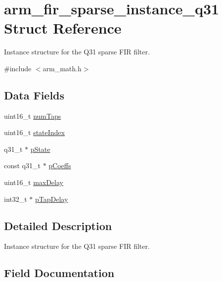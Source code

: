 \hypertarget{structarm__fir__sparse__instance__q31}{}\section{arm\+\_\+fir\+\_\+sparse\+\_\+instance\+\_\+q31 Struct Reference}
\label{structarm__fir__sparse__instance__q31}


Instance structure for the Q31 sparse F\+IR filter.  




{\ttfamily \#include $<$arm\+\_\+math.\+h$>$}

\subsection*{Data Fields}
\begin{DoxyCompactItemize}
\item 
uint16\+\_\+t \mbox{\hyperlink{structarm__fir__sparse__instance__q31_a751941891e47f522a7f5375fe8990aac}{num\+Taps}}
\item 
uint16\+\_\+t \mbox{\hyperlink{structarm__fir__sparse__instance__q31_a566a0cb53437e48b9a3bf18e5b03d8aa}{state\+Index}}
\item 
q31\+\_\+t $\ast$ \mbox{\hyperlink{structarm__fir__sparse__instance__q31_adee4ba3ee8869865af7d8fa08ca913d6}{p\+State}}
\item 
const q31\+\_\+t $\ast$ \mbox{\hyperlink{structarm__fir__sparse__instance__q31_a80e7fdf4747dbda8eadb2663fb4be317}{p\+Coeffs}}
\item 
uint16\+\_\+t \mbox{\hyperlink{structarm__fir__sparse__instance__q31_ab25f4ee7550e6d92acff77ada283733f}{max\+Delay}}
\item 
int32\+\_\+t $\ast$ \mbox{\hyperlink{structarm__fir__sparse__instance__q31_adec00b3793ab4f08edfeb4ea6a9eb6e6}{p\+Tap\+Delay}}
\end{DoxyCompactItemize}


\subsection{Detailed Description}
Instance structure for the Q31 sparse F\+IR filter. 

\subsection{Field Documentation}
\mbox{\label{structarm__fir__sparse__instance__q31_ab25f4ee7550e6d92acff77ada283733f}} 
